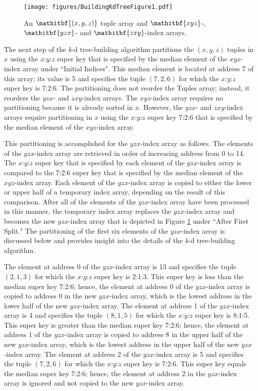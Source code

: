 \documentclass{sig-alternate}
\begin{document}
\begin{figure}[h]
\centering
\centerline{\texttt{[image: figures/BuildingKdTreeFigure1.pdf]}}
\caption{An $\mathitbf{\left(x,y,z\right)}$ tuple array and $\mathitbf{xyz}$-, $\mathitbf{yzx}$- and $\mathitbf{zxy}$-index arrays.}
\label{fig:IndexArrays}
\end{figure}

The next step of the \emph{k}-d tree-building algorithm partitions the $\left(x,y,z\right)$ tuples in $x$ using the $x$:$y$:$z$ super key that is specified by the median element of the $xyz$-index array under ``Initial Indices".  This median element is located at address 7 of this array; its value is 5 and specifies the tuple $\left(7,2,6\right)$ for which the $x$:$y$:$z$ super key is 7:2:6.  The partitioning does not reorder the Tuples array; instead, it reorders the $yzx$- and $zxy$-index arrays.  The $xyz$-index array requires no partitioning because it is already sorted in $x$.  However, the $yzx$- and $zxy$-index arrays require partitioning in $x$ using the $x$:$y$:$z$ super key 7:2:6 that is specified by the median element of the $xyz$-index array.

This partitioning is accomplished for the $yzx$-index array as follows.  The elements of the $yzx$-index array are retrieved in order of increasing address from 0 to 14.  The $x$:$y$:$z$ super key that is specified by each element of the $yzx$-index array is compared to the 7:2:6 super key that is specified by the median element of the $xyz$-index array.  Each element of the $yzx$-index array is copied to either the lower or upper half of a temporary index array, depending on the result of this comparison.  After all of the elements of the $yzx$-index array have been processed in this manner, the temporary index array replaces the $yzx$-index array and becomes the new $yzx$-index array that is depicted in Figure \ref{fig:IndexArrays} under ``After First Split."  The partitioning of the first six elements of the $yzx$-index array is discussed below and provides insight into the details of the \emph{k}-d tree-building algorithm.

The element at address 0 of the $yzx$-index array is 13 and specifies the tuple $\left(2,1,3\right)$ for which the $x$:$y$:$z$ super key is 2:1:3.  This super key is less than the median super key 7:2:6; hence, the element at address 0 of the $yzx$-index array is copied to address 0 in the new $yzx$-index array, which is the lowest address in the lower half of the new $yzx$-index array.  The element at address 1 of the $yzx$-index array is 4 and specifies the tuple $\left(8,1,5\right)$ for which the $x$:$y$:$z$ super key is 8:1:5.  This super key is greater than the median super key 7:2:6; hence, the element at address 1 of the $yzx$-index array is copied to address 8 in the upper half of the new $yzx$-index array, which is the lowest address in the upper half of the new $yzx$-index array.  The element at address 2 of the $yzx$-index array is 5 and specifies the tuple $\left(7,2,6\right)$ for which the $x$:$y$:$z$ super key is 7:2:6.  This super key equals the median super key 7:2:6; hence, the element at address 2 in the $yzx$-index array is ignored and not copied to the new $yzx$-index array.
\end{document}
